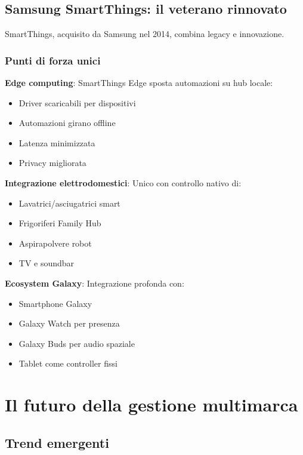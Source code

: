 \subsection{Samsung SmartThings: il veterano rinnovato}

SmartThings, acquisito da Samsung nel 2014, combina legacy e innovazione.

\subsubsection{Punti di forza unici}

\textbf{Edge computing}: SmartThings Edge sposta automazioni su hub locale:
\begin{itemize}
    \item Driver scaricabili per dispositivi
    \item Automazioni girano offline
    \item Latenza minimizzata
    \item Privacy migliorata
\end{itemize}

\textbf{Integrazione elettrodomestici}: Unico con controllo nativo di:
\begin{itemize}
    \item Lavatrici/asciugatrici smart
    \item Frigoriferi Family Hub
    \item Aspirapolvere robot
    \item TV e soundbar
\end{itemize}

\textbf{Ecosystem Galaxy}: Integrazione profonda con:
\begin{itemize}
    \item Smartphone Galaxy
    \item Galaxy Watch per presenza
    \item Galaxy Buds per audio spaziale
    \item Tablet come controller fissi
\end{itemize}

\cite{SmartThings}

\section{Il futuro della gestione multimarca}

\subsection{Trend emergenti}

